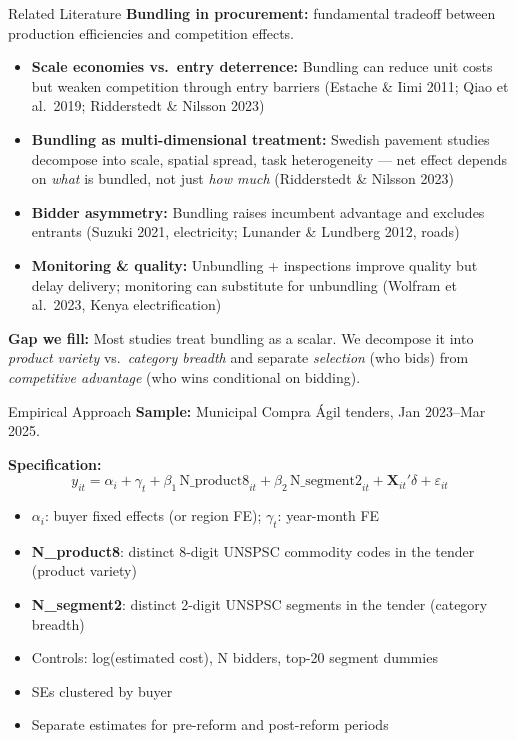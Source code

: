\documentclass[9pt,aspectratio=169]{beamer}
\begin{document}
\begin{frame}{Related Literature}
\textbf{Bundling in procurement:} fundamental tradeoff between production efficiencies and competition effects.
\begin{itemize}
  \item \textbf{Scale economies vs.\ entry deterrence:}
        Bundling can reduce unit costs but weaken competition through entry barriers
        (Estache \& Iimi 2011; Qiao et al.\ 2019; Ridderstedt \& Nilsson 2023)
  \item \textbf{Bundling as multi-dimensional treatment:}
        Swedish pavement studies decompose into scale, spatial spread, task heterogeneity ---
        net effect depends on \textit{what} is bundled, not just \textit{how much}
        (Ridderstedt \& Nilsson 2023)
  \item \textbf{Bidder asymmetry:}
        Bundling raises incumbent advantage and excludes entrants
        (Suzuki 2021, electricity; Lunander \& Lundberg 2012, roads)
  \item \textbf{Monitoring \& quality:}
        Unbundling + inspections improve quality but delay delivery;
        monitoring can substitute for unbundling
        (Wolfram et al.\ 2023, Kenya electrification)
\end{itemize}

\medskip
\textbf{Gap we fill:} Most studies treat bundling as a scalar. We decompose it into \textit{product variety} vs.\ \textit{category breadth} and separate \textit{selection} (who bids) from \textit{competitive advantage} (who wins conditional on bidding).
\end{frame}

\begin{frame}{Empirical Approach}
\textbf{Sample:} Municipal Compra Ágil tenders, Jan 2023--Mar 2025.

\bigskip
\textbf{Specification:}
\[
  y_{it} = \alpha_i + \gamma_t + \beta_1 \, \text{N\_product8}_{it} + \beta_2 \, \text{N\_segment2}_{it} + \mathbf{X}_{it}'\delta + \varepsilon_{it}
\]

\begin{itemize}
  \item $\alpha_i$: buyer fixed effects (or region FE); $\gamma_t$: year-month FE
  \item \textbf{N\_product8}: distinct 8-digit UNSPSC commodity codes in the tender (product variety)
  \item \textbf{N\_segment2}: distinct 2-digit UNSPSC segments in the tender (category breadth)
  \item Controls: log(estimated cost), N bidders, top-20 segment dummies
  \item SEs clustered by buyer
  \item Separate estimates for pre-reform and post-reform periods
\end{itemize}
\end{frame}
\end{document}
